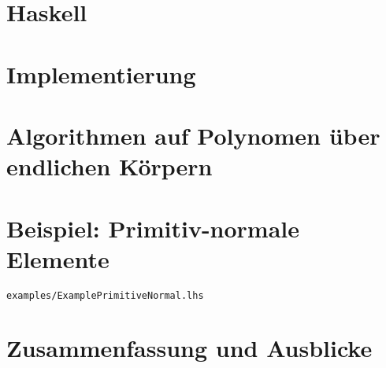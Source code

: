 \documentclass[ngerman
  ,fontsize=11pt %
  ,numbers=noenddot %
  ,parskip=half*
  ,openany
  ,DIV=10
  ,fleqn %
  ,oneside
  ,DIV=10
]{./myClass}
\begin{document}
\ifnum{}
  \frontmatter
  
  \newpage \thispagestyle{empty} \mbox{}
\else
  \mainmatter
\fi

\tableofcontents{}


\ifnum{}
  \mainmatter
\fi

%

\chapter{Haskell}


\chapter{Implementierung}








\chapter{Algorithmen auf Polynomen über endlichen Körpern}
\label{chap:algs}





%
\chapter{Beispiel: Primitiv-normale Elemente}
\label{chap:bsp-prim-norm}
\texttt{examples/ExamplePrimitiveNormal.lhs}




\chapter{Zusammenfassung und Ausblicke}


\pagebreak
\printbibliography

\appendix
{}



\end{document}
